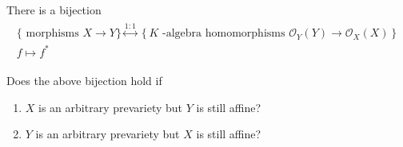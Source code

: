 \begin{proposition}[?]

There is a bijection
\begin{align*}
\begin{array}{c}
\{\text { morphisms } X \rightarrow Y\} \stackrel{1: 1}{\longleftrightarrow}\left\{K \text { -algebra homomorphisms } \mathscr{O}_{Y}(Y) \rightarrow \mathscr{O}_{X}(X)\right\} \\
f \longmapsto f^{*}
\end{array}
\end{align*}

\end{proposition}

\begin{problem}[Gathmann 5.9]

Does the above bijection hold if

\begin{enumerate}
\def\labelenumi{\alph{enumi}.}
\tightlist
\item
  \(X\) is an arbitrary prevariety but \(Y\) is still affine?
\item
  \(Y\) is an arbitrary prevariety but \(X\) is still affine?
\end{enumerate}

\end{problem}

\cleardoublepage

\renewcommand{\listtheoremname}{}
\listoftheorems[ignoreall,show={definition}, numwidth=3.5em]
\cleardoublepage

\renewcommand{\listtheoremname}{}
\listoftheorems[ignoreall,show={theorem,proposition}, numwidth=3.5em]
\cleardoublepage

\renewcommand{\listtheoremname}{}
\listoftheorems[ignoreall,show={exercise}, numwidth=3.5em]
\cleardoublepage

\listoffigures
\cleardoublepage


\printbibliography[title=Bibliography]



